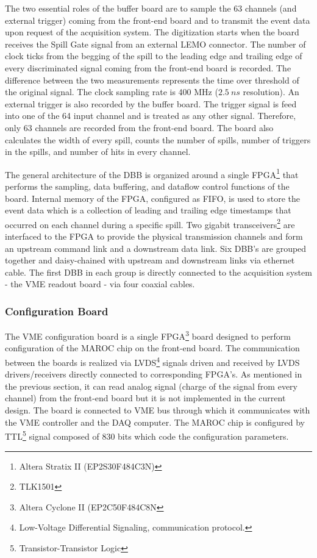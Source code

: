 \documentclass[a4paper,11pt]{article}
\begin{document}
The two essential roles of the buffer board are to sample the 63 channels (and external trigger) coming from the front-end board and to transmit
the event data upon request of the acquisition system. The digitization starts when the board receives the Spill Gate signal from an external LEMO
connector. The number of clock ticks from the begging of the spill to the leading edge and trailing edge of every discriminated signal coming from
the front-end board is recorded. The difference between the two measurements represents the time over threshold of the original signal. The clock
sampling rate is 400 MHz ($2.5 \ ns$ resolution). An external trigger is also recorded by the buffer board. The trigger signal is feed into one of
the 64 input channel and is treated as any other signal. Therefore, only 63 channels are recorded from the front-end board. The board also calculates the width of every spill,
counts the number of spills, number of triggers in the spills, and number of hits in every channel.

The general architecture of the DBB is organized around a single FPGA\footnote{Altera Stratix II (EP2S30F484C3N)} that performs the sampling, data
buffering, and dataflow control functions of the board. Internal memory of the FPGA, configured as FIFO, is used to store the event data which is
a collection of leading and trailing edge timestamps that occurred on each channel during a specific spill. Two gigabit transceivers\footnote{TLK1501}
are interfaced to the FPGA to provide the physical transmission channels and form an upstream command link and a downstream data link. Six DBB's are
grouped together and daisy-chained with upstream and downstream links via ethernet cable. The first DBB in each group is directly connected to the
acquisition system - the VME readout board - via four coaxial cables.

\subsubsection{Configuration Board}
The VME configuration board is a single FPGA\footnote{Altera Cyclone II (EP2C50F484C8N} board designed to perform configuration of the MAROC chip
on the front-end board. The communication between the boards is realized via LVDS\footnote{Low-Voltage Differential Signaling, communication protocol.}
signals driven and received by LVDS drivers/receivers directly connected to corresponding FPGA's. As mentioned in the previous section, it can read
analog signal (charge of the signal from every channel) from the front-end board but it is not implemented in the current design. The board is connected
to VME bus through which it communicates with the VME controller and the DAQ computer. The MAROC chip is configured by TTL\footnote{Transistor-Transistor
Logic} signal composed of 830 bits which code the configuration parameters.
\end{document}
